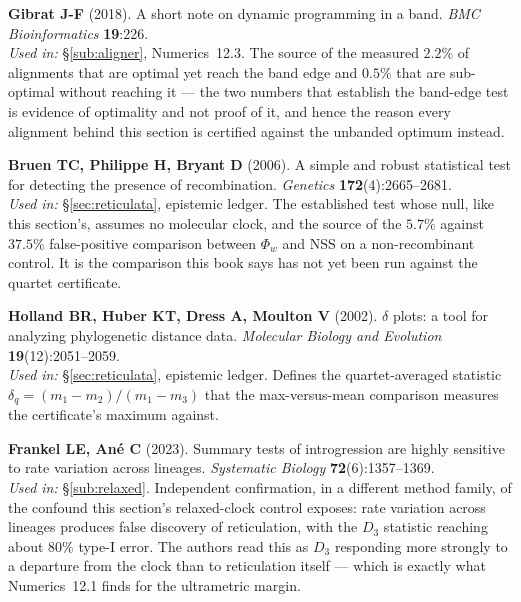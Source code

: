 \begin{refs}
\item \textbf{Gibrat J-F} (2018). A short note on dynamic programming in a band.
\emph{BMC Bioinformatics} \textbf{19}:226. 
\\[0.15em]
\emph{Used in:} §\ref{sub:aligner}, Numerics~12.3. The source of the measured
$2.2\%$ of alignments that are optimal yet reach the band edge and $0.5\%$ that
are sub-optimal without reaching it --- the two numbers that establish the
band-edge test is evidence of optimality and not proof of it, and hence the
reason every alignment behind this section is certified against the unbanded
optimum instead.

\item \textbf{Bruen TC, Philippe H, Bryant D} (2006). A simple and robust
statistical test for detecting the presence of recombination. \emph{Genetics}
\textbf{172}(4):2665--2681. 
\\[0.15em]
\emph{Used in:} §\ref{sec:reticulata}, epistemic ledger. The established test
whose null, like this section's, assumes no molecular clock, and the source of
the $5.7\%$ against $37.5\%$ false-positive comparison between $\Phi_w$ and NSS
on a non-recombinant control. It is the comparison this book says has not yet
been run against the quartet certificate.

\item \textbf{Holland BR, Huber KT, Dress A, Moulton V} (2002). $\delta$ plots:
a tool for analyzing phylogenetic distance data. \emph{Molecular Biology and
Evolution} \textbf{19}(12):2051--2059.
\\[0.15em]
\emph{Used in:} §\ref{sec:reticulata}, epistemic ledger. Defines the
quartet-averaged statistic $\delta_q = (m_1-m_2)/(m_1-m_3)$ that the
max-versus-mean comparison measures the certificate's maximum against.

\item \textbf{Frankel LE, Ané C} (2023). Summary tests of introgression are
highly sensitive to rate variation across lineages. \emph{Systematic Biology}
\textbf{72}(6):1357--1369. 
\\[0.15em]
\emph{Used in:} §\ref{sub:relaxed}. Independent confirmation, in a different
method family, of the confound this section's relaxed-clock control exposes:
rate variation across lineages produces false discovery of reticulation, with
the $D_3$ statistic reaching about $80\%$ type-I error. The authors read this as
$D_3$ responding more strongly to a departure from the clock than to
reticulation itself --- which is exactly what Numerics~12.1 finds for the
ultrametric margin.


\end{refs}
